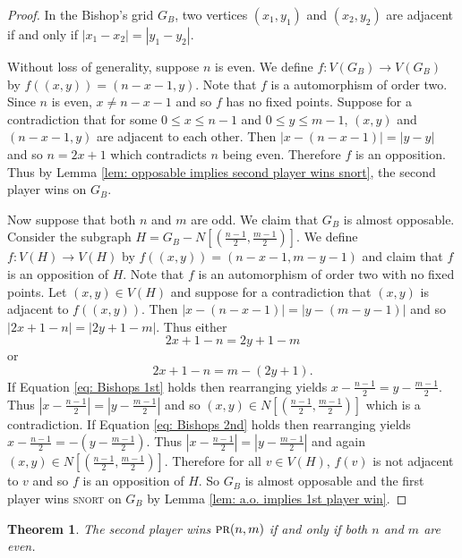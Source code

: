 \documentclass[11pt]{article}
\newtheorem{theorem}{Theorem}[section]
\theoremstyle{definition}
\begin{document}
\begin{proof}
    In the Bishop's grid $G_B$, two vertices $(x_1, y_1)$ and $(x_2, y_2)$ are
    adjacent if and only if $|x_1 - x_2| = |y_1 - y_2|$. 

    Without loss of generality, suppose $n$ is even. We define $f: V(G_B) \to
    V(G_B)$ by $f((x,y)) = (n-x-1, y)$. Note that $f$ is a automorphism of
    order two. Since $n$ is even, $x \neq n-x-1$ and so $f$ has no fixed
    points. Suppose for a contradiction that for some $0\leq x\leq n-1$ and
    $0\leq y\leq m-1$, $(x,y)$ and $(n-x-1, y)$ are adjacent to each other.
    Then $|x-(n-x-1)| = |y-y|$ and so $n=2x+1$ which contradicts $n$ being
    even. Therefore $f$ is an opposition. Thus by Lemma \ref{lem: opposable
    implies second player wins snort}, the second player wins on $G_B$. 

    Now suppose that both $n$ and $m$ are odd. We claim that $G_B$ is almost
    opposable. Consider the subgraph $H = G_B - N[(\frac{n-1}{2},
    \frac{m-1}{2})]$. We define $f:V(H) \to V(H)$ by $f((x,y)) = (n-x-1,
    m-y-1)$ and claim that $f$ is an opposition of $H$. Note that $f$ is an
    automorphism of order two with no fixed points. Let $(x,y) \in V(H)$ and
    suppose for a contradiction that $(x,y)$ is adjacent to $f((x,y))$. Then
    $|x - (n-x-1)| = |y - (m-y-1)|$ and so $|2x+1-n| = |2y+1-m|$. Thus either 
    \begin{equation}
        \label{eq: Bishops 1st}
        2x+1-n = 2y+1-m
    \end{equation}
    or 
    \begin{equation}
        \label{eq: Bishops 2nd}
        2x+1-n = m-(2y+1).
    \end{equation}
    If Equation \eqref{eq: Bishops 1st} holds then rearranging yields $x-
    \frac{n-1}{2} = y - \frac{m-1}{2}$. Thus $|x- \frac{n-1}{2}| = |y -
    \frac{m-1}{2}|$ and so $(x,y) \in N[(\frac{n-1}{2}, \frac{m-1}{2})]$ which
    is a contradiction. If Equation \eqref{eq: Bishops 2nd} holds then
    rearranging yields $x-\frac{n-1}{2} = -\left( y-\frac{m-1}{2} \right)$.
    Thus $|x- \frac{n-1}{2}| = |y - \frac{m-1}{2}|$ and again $(x,y) \in
    N[(\frac{n-1}{2}, \frac{m-1}{2})]$. Therefore for all $v\in V(H)$, $f(v)$
    is not adjacent to $v$ and so $f$ is an opposition of $H$. So $G_B$ is
    almost opposable and the first player wins \textsc{snort} on $G_B$ by Lemma
    \ref{lem: a.o. implies 1st player win}.
\end{proof}

\begin{theorem}
    \label{thm: PR outcomes}
    The second player wins $\textsc{pr}(n,m)$ if and only if both $n$ and $m$
    are even.
\end{theorem}
\end{document}
